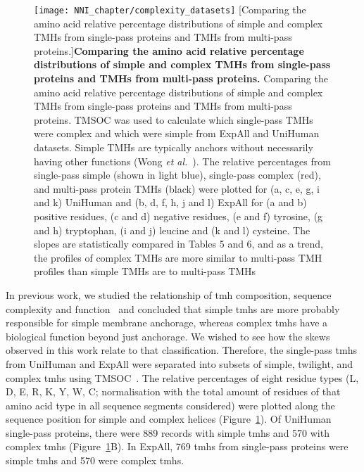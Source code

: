 \begin{figure}[p]
\centering
\texttt{[image: NNI\_chapter/complexity\_datasets]}
[Comparing the amino acid relative percentage distributions of simple and complex TMHs from single-pass proteins and TMHs from multi-pass proteins.]{\textbf{Comparing the amino acid relative percentage distributions of simple and complex TMHs from single-pass proteins and TMHs from multi-pass proteins.} Comparing the amino acid relative percentage distributions of simple and complex TMHs from single-pass proteins and TMHs from multi-pass proteins. TMSOC was used to calculate which single-pass TMHs were complex and which were simple from ExpAll and UniHuman datasets. Simple TMHs are typically anchors without necessarily having other functions (Wong \textit{et al.}~\cite{Wong2010}). The relative percentages from single-pass simple (shown in light blue), single-pass complex (red), and multi-pass protein TMHs (black) were plotted for (a, c, e, g, i and k) UniHuman and (b, d, f, h, j and l) ExpAll for (a and b) positive residues, (c and d) negative residues, (e and f) tyrosine, (g and h) tryptophan, (i and j) leucine and (k and l) cysteine. The slopes are statistically compared in Tables 5 and 6, and as a trend, the profiles of complex TMHs are more similar to multi-pass TMH profiles than simple TMHs are to multi-pass TMHs}

\label{fig:complexity_datasets}
\end{figure}

In previous work, we studied the relationship of \gls{tmh} composition, sequence complexity and function~\cite{Wong2010, Wong2011, Wong2012} and concluded that simple \gls{tmh}s are more probably responsible for simple membrane anchorage, whereas complex \gls{tmh}s have a biological function beyond just anchorage. We wished to see how the skews observed in this work relate to that classification. Therefore, the single-pass \gls{tmh}s from UniHuman and ExpAll were separated into subsets of simple, twilight, and complex \gls{tmh}s using TMSOC~\cite{Wong2011, Wong2012}. The relative percentages of eight residue types (L, D, E, R, K, Y, W, C\@; normalisation with the total amount of residues of that amino acid type in all sequence segments considered) were plotted along the sequence position for simple and complex helices (Figure~\ref{fig:complexity_datasets}). Of UniHuman single-pass proteins, there were 889 records with simple \gls{tmh}s and 570 with complex \gls{tmh}s (Figure~\ref{fig:complexity_datasets}B). In ExpAll, 769 \gls{tmh}s from single-pass proteins were simple \gls{tmh}s and 570 were complex \gls{tmh}s.

